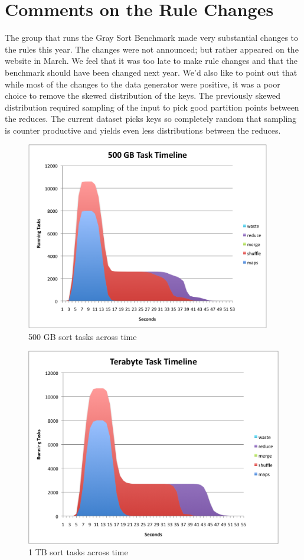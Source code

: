 \documentclass{article}
\begin{document}
\section{Comments on the Rule Changes}

The group that runs the Gray Sort Benchmark made very substantial
changes to the rules this year. The changes were not announced; but
rather appeared on the website in March. We feel that it was too late
to make rule changes and that the benchmark should have been changed
next year. We'd also like to point out that while most of the changes to
the data generator were positive, it was a poor choice to remove the
skewed distribution of the keys. The previously skewed distribution
required sampling of the input to pick good partition points between
the reduces. The current dataset picks keys so completely random that
sampling is counter productive and yields even less distributions between the
reduces.




\begin{figure}[!p]
\includegraphics[width=4.21in]{500GBTaskTime.png}
\caption{500 GB sort tasks across time}\label{500GbTimeline}
\end{figure} 

\begin{figure}[!p]
\includegraphics[width=4.5in]{1TBTaskTime.png}
\caption{1 TB sort tasks across time}\label{1TbTimeline}
\end{figure} 
\end{document}

